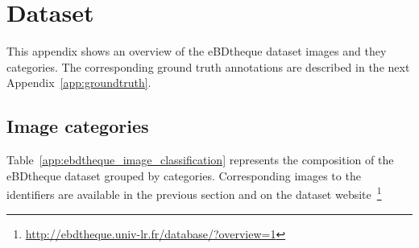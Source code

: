 \chapter{Dataset}
\label{app:dataset}
\graphicspath{{./chapters/Appendix/figs/}}

This appendix shows an overview of the eBDtheque dataset images and they categories.
The corresponding ground truth annotations are described in the next Appendix~\ref{app:groundtruth}.




\section{Image categories}

Table~\ref{app:ebdtheque_image_classification} represents the composition of the eBDtheque dataset grouped by categories. 
Corresponding images to the identifiers are available in the previous section and on the dataset website~\footnote{\url{http://ebdtheque.univ-lr.fr/database/?overview=1}}


